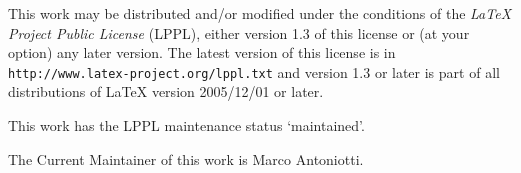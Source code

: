 \documentclass[../../CDR-IEEE-754-support.tex]{subfiles}
\begin{document}

This work may be distributed and/or modified under the conditions of
the \emph{LaTeX Project Public License} (LPPL), either version 1.3 of
this license or (at your option) any later version. The latest version
of this license is in \texttt{http://www.latex-project.org/lppl.txt}
and version 1.3 or later is part of all distributions of LaTeX version
2005/12/01 or later.

\noindent
This work has the LPPL maintenance status `maintained'.

\noindent
The Current Maintainer of this work is Marco Antoniotti.
\end{document}
